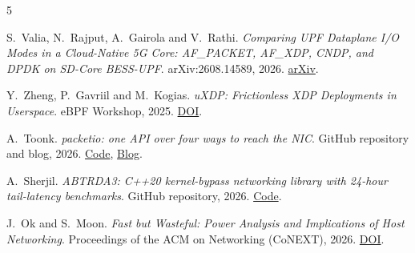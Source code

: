 \documentclass[11pt,a4paper]{article}
\begin{document}
\clearpage
\begin{thebibliography}{5}
\footnotesize
\setlength{\itemsep}{3pt}

S.~Valia, N.~Rajput, A.~Gairola and V.~Rathi.
\emph{Comparing UPF Dataplane I/O Modes in a Cloud-Native 5G Core: AF\_PACKET, AF\_XDP, CNDP, and DPDK on SD-Core BESS-UPF}.
arXiv:2608.14589, 2026.
\href{https://arxiv.org/abs/2608.14589}{arXiv}.

Y.~Zheng, P.~Gavriil and M.~Kogias.
\emph{uXDP: Frictionless XDP Deployments in Userspace}.
eBPF Workshop, 2025.
\href{https://doi.org/10.1145/3748355.3748360}{DOI}.

A.~Toonk.
\emph{packetio: one API over four ways to reach the NIC}.
GitHub repository and blog, 2026.
\href{https://github.com/atoonk/packetio}{Code}, \href{https://toonk.io/packetio/}{Blog}.

A.~Sherjil.
\emph{ABTRDA3: C++20 kernel-bypass networking library with 24-hour tail-latency benchmarks}.
GitHub repository, 2026.
\href{https://github.com/ASherjil/ABTRDA3}{Code}.

J.~Ok and S.~Moon.
\emph{Fast but Wasteful: Power Analysis and Implications of Host Networking}.
Proceedings of the ACM on Networking (CoNEXT), 2026.
\href{https://doi.org/10.1145/3786287}{DOI}.

\end{thebibliography}
\end{document}
